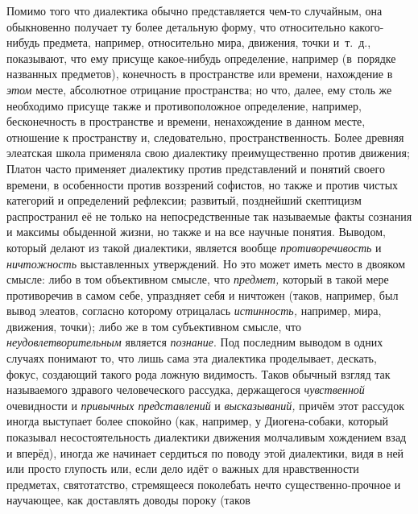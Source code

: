 Помимо того что диалектика обычно представляется чем-то
случайным, она обыкновенно получает ту более детальную форму, что
относительно какого-нибудь предмета, например, относительно мира, движения,
точки и~т.~д., показывают, что ему присуще какое-нибудь определение,
например (в~порядке названных предметов), конечность в пространстве или
времени, нахождение в {\em этом}
месте, абсолютное отрицание пространства; но что, далее, ему
столь же необходимо присуще также и противоположное определение, например,
бесконечность в пространстве и времени, ненахождение в данном месте,
отношение к пространству и, следовательно, пространственность. Более
древняя элеатская школа применяла свою диалектику преимущественно против
движения; Платон часто применяет диалектику против представлений и понятий
своего времени, в особенности против воззрений софистов, но также и против
чистых категорий и определений рефлексии; развитый, позднейший скептицизм
распространил её не только на непосредственные так называемые факты
сознания и максимы обыденной жизни, но также и на все научные понятия.
Выводом, который делают из такой диалектики, является вообще
{\em противоречивость} и {\em ничтожность}
выставленных утверждений. Но это может иметь место в двояком
смысле: либо в том объективном смысле, что {\em предмет,} который в
такой мере противоречив в самом себе, упраздняет себя и ничтожен (таков,
например, был вывод элеатов, согласно которому отрицалась {\em истинность,}
например, мира, движения, точки); либо же в том субъективном
смысле, что {\em неудовлетворительным} является {\em познание}.
Под последним выводом в одних случаях понимают то, что лишь
сама эта диалектика проделывает, дескать, фокус, создающий такого рода
ложную видимость. Таков обычный взгляд так называемого здравого
человеческого рассудка, держащегося {\em чувственной} очевидности и
{\em привычных представлений} и {\em высказываний,}
причём этот рассудок иногда выступает более спокойно (как, например, у
Диогена-собаки,
который показывал несостоятельность диалектики движения
молчаливым хождением взад и вперёд), иногда же начинает сердиться по поводу
этой диалектики, видя в ней или просто глупость или, если дело идёт о
важных для нравственности предметах, святотатство, стремящееся поколебать
нечто существенно-прочное и научающее, как доставлять доводы пороку (таков
